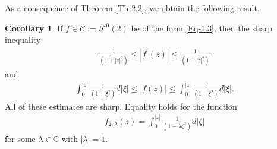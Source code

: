 \documentclass[a4paper,12pt]{amsart}
\theoremstyle{plain}
\theoremstyle{definition}
\newtheorem{cor}{Corollary}[section]
\theoremstyle{plain}
\begin{document}
As a consequence of Theorem \ref{Th-2.2}, we obtain the following result.
\begin{cor}
	If $f\in \mathcal{C} := \mathcal{F}^0(2)$ be of the form \eqref{Eq-1.3}, then the sharp inequality 
	\begin{align}
		\frac{1}{(1+|z|^2)}\leq|f^{\prime}(z)|\leq\frac{1}{(1-|z|^2)}	
	\end{align}
	and
	\begin{align}
		\int_{0}^{|z|}\frac{1}{(1+\xi^2)} d|\xi|\leq	|f(z)|\leq\int_{0}^{|z|}\frac{1}{(1-\xi^2)} d|\xi|.
	\end{align}
	All of these estimates are sharp. Equality holds for the function \begin{align*}
		f_{2, \lambda}(z)=\int_{0}^{|z|}\frac{1}{(1-\lambda \zeta^2)}d|\zeta|
	\end{align*} for some $\lambda\in\mathbb{C}$ with $|\lambda|=1$.
\end{cor}
\end{document}
